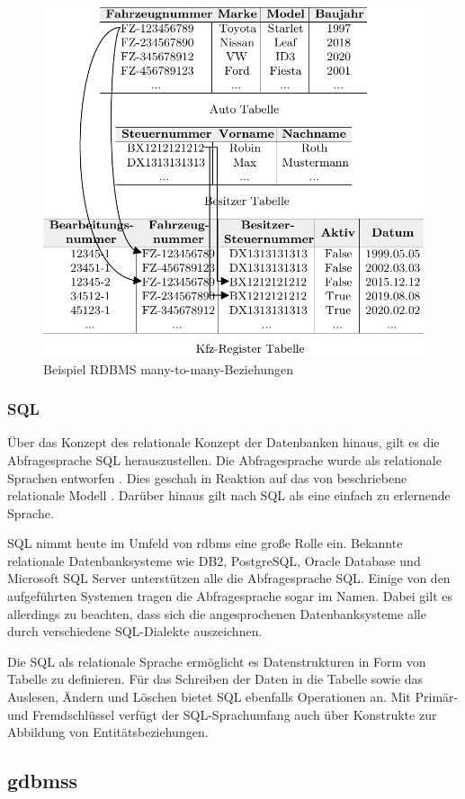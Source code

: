 \begin{figure}[h]
    \centering
    \includegraphics[width=\textwidth]{images/many-to-many.pdf}
    \caption{Beispiel RDBMS many-to-many-Beziehungen}
    \label{fig:rdbms_m2m}
\end{figure}

\subsubsection{SQL}
Über das Konzept des relationale Konzept der Datenbanken hinaus, gilt es die Abfragesprache SQL herauszustellen. Die Abfragesprache wurde als relationale Sprachen entworfen \cite{sql_history}. Dies geschah in Reaktion auf das von \citeauthor{codd_relational_model} beschriebene relationale Modell \cite{sql_history}. Darüber hinaus gilt nach \cite{sql_history} SQL als eine einfach zu erlernende Sprache. 

SQL nimmt heute im Umfeld von \acs{rdbms} eine große Rolle ein. Bekannte relationale Datenbanksysteme wie DB2, PostgreSQL, Oracle Database und Microsoft SQL Server unterstützen alle die Abfragesprache SQL. Einige von den aufgeführten Systemen tragen die Abfragesprache sogar im Namen. Dabei gilt es allerdings zu beachten, dass sich die angesprochenen Datenbanksysteme alle durch verschiedene SQL-Dialekte auszeichnen. 

Die SQL als relationale Sprache ermöglicht es Datenstrukturen in Form von Tabelle zu definieren. Für das Schreiben der Daten in die Tabelle sowie das Auslesen, Ändern und Löschen bietet SQL ebenfalls Operationen an. Mit Primär- und Fremdschlüssel verfügt der SQL-Sprachumfang auch über Konstrukte zur Abbildung von Entitätsbeziehungen. 

\subsection{\acl{gdbms}s}



